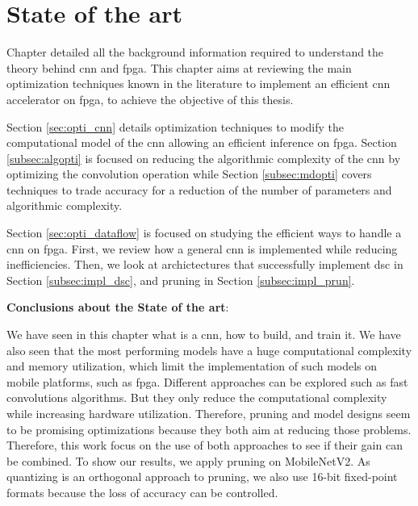 \chapter{State of the art} \label{chap:sota}
Chapter  detailed all the background information required to understand the theory behind \acrshort{cnn} and \acrshort{fpga}. This chapter aims at reviewing the main optimization techniques known in the literature to implement an efficient \acrshort{cnn} accelerator on \acrshort{fpga}, to achieve the objective of this thesis.

Section \ref{sec:opti_cnn} details optimization techniques to modify the computational model of the \acrshort{cnn} allowing an efficient inference on \acrshort{fpga}. Section \ref{subsec:algopti} is focused on reducing the algorithmic complexity of the \acrshort{cnn} by optimizing the convolution operation while Section \ref{subsec:mdopti} covers techniques to trade accuracy for a reduction of the number of parameters and algorithmic complexity.

Section \ref{sec:opti_dataflow} is focused on studying the efficient ways to handle a \acrshort{cnn} on \acrshort{fpga}. First, we review how a general \acrshort{cnn} is implemented while reducing inefficiencies. Then, we look at archictectures that successfully implement \acrshort{dsc} in Section \ref{subsec:impl_dsc}, and pruning in Section \ref{subsec:impl_prun}.

%

%
\begin{tcolorbox}
    \textbf{Conclusions about the State of the art}:

    We have seen in this chapter what is a \acrshort{cnn}, how to build, and train it. We have also seen that the most performing models have a huge computational complexity and memory utilization, which limit the implementation of such models on mobile platforms, such as \acrshort{fpga}. Different approaches can be explored such as fast convolutions algorithms. But they only reduce the computational complexity while increasing hardware utilization. Therefore, pruning and model designs seem to be promising optimizations because they both aim at reducing those problems. Therefore, this work focus on the use of both approaches to see if their gain can be combined. To show our results, we apply pruning on MobileNetV2. As quantizing is an orthogonal approach to pruning, we also use 16-bit fixed-point formats because the loss of accuracy can be controlled.
\end{tcolorbox}
\afterpage{\blankpage}
\cleardoublepage
\newpage
